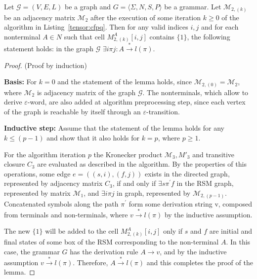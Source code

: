 \begin{lemma}
    \label{lemma:algo:correctness}
    Let $\mathcal{G} = (V,E,L)$ be a graph and $G = \langle\Sigma, N, S, P\rangle$ be a grammar.
    Let $\mathcal{M}_{2,(k)}$ be an adjacency matrix $\mathcal{M}_2$ after the execution of some iteration $k \geq 0$ of the algorithm in Listing~\ref{tensor:cfpq}.
    Then for any valid indices $i, j$ and for each nonterminal $A \in N$ such that cell $M_{2,(k)}^A[i,j]$ contains $\{1\}$, the following statement holds: in the graph $\mathcal{G}$ $\exists i\pi j: A \xrightarrow{*} l(\pi)$.
\end{lemma}

\begin{proof}{(Proof by induction)}

    \textbf{Basis:} For $k = 0$ and the statement of the lemma holds, since
    $\mathcal{M}_{2,(0)} = \mathcal{M}_2$, where $\mathcal{M}_2$ is adjacency matrix of the graph $\mathcal{G}$. The nonterminals,
    which allow to derive $\varepsilon$-word, are also added at algorithm
    preprocessing step, since each vertex of the graph is reachable by itself 
    through an $\varepsilon$-transition.
    
    \textbf{Inductive step:} Assume that the statement of the lemma holds for any
    $k \leq (p - 1)$ and show that it also holds for $k = p$, where $p \geq 1$.
    
    For the algorithm iteration $p$ the Kronecker product $\mathcal{M}_3, M'_3$ and transitive
    closure $C_3$ are evaluated as described in the algorithm. By the properties
    of this operations, some edge $e = ((s,i),(f,j))$ exists in the directed
    graph, represented by adjacency matrix $C_3$, if and only if $\exists s
    \pi ^{'} f$ in the RSM graph, represented by matrix $\mathcal{M}_1$, and 
    $\exists i \pi j$ in graph, represented by $\mathcal{M}_{2,(p-1)}$. Concatenated symbols 
    along the path $\pi^{'}$ form some derivation string v, composed from terminals
    and non-terminals, where $v \xrightarrow{*} l(\pi)$  by the inductive assumption.
    
    The new $\{1\}$ will be added to the cell $M_{2,(k)}^A[i,j]$ only if $s$ and $f$ 
    are initial and final states of some box of the RSM corresponding to 
    the non-terminal $A$. In this case, the grammar $G$ has the derivation rule
    $A \to v$, and by the inductive assumption $v \xrightarrow{*} l(\pi)$. Therefore, 
    $A \xrightarrow{*} l(\pi)$ and this completes the proof of the lemma.
    
\end{proof}

